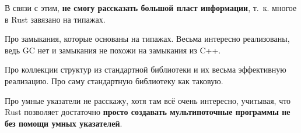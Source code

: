 \begin{frame}{\insertsubsection}
{    В связи с этим, \textbf{не смогу рассказать большой пласт информации}, т. к.
    многое в Rust завязано на типажах.

  }

   {

    Про замыкания, которые основаны на типажах. Весьма интересно реализованы,
    ведь GC нет и замыкания не похожи на замыкания из C++.

  }

   {

    Про коллекции структур из стандартной библиотеки и их весьма эффективную
    реализацию. Про саму стандартную библиотеку как таковую.

    Про умные указатели не расскажу, хотя там всё очень интересно, учитывая, что
    Rust позволяет достаточно \textbf{просто создавать мультипоточные программы
      не без помощи умных указателей}.

  }



\end{frame}
